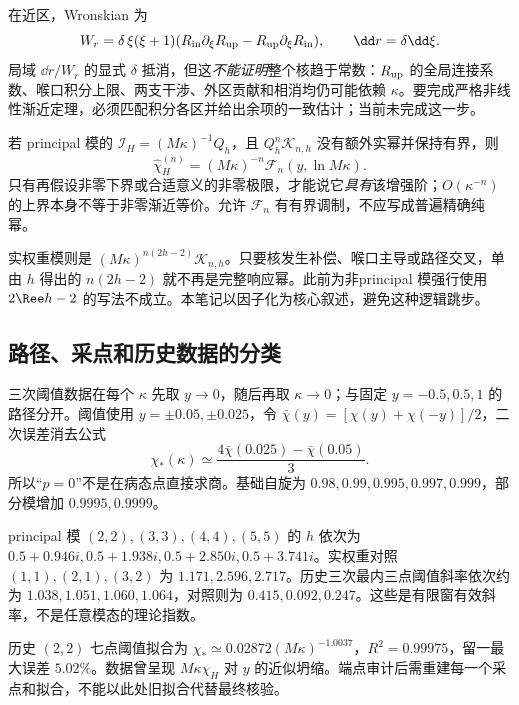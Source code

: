 在近区，Wronskian 为
\begin{equation}
 W_r=\delta\,\xi(\xi+1)
 (R_{\rm in}\partial_\xi R_{\rm up}-R_{\rm up}\partial_\xi R_{\rm in}),
 \qquad\dd r=\delta\dd\xi.
\end{equation}
局域 $\dd r/W_r$ 的显式 $\delta$ 抵消，但这\emph{不能证明}整个核趋于常数：$R_{\rm up}$ 的全局连接系数、喉口积分上限、两支干涉、外区贡献和相消均仍可能依赖 $\kappa$。要完成严格非线性渐近定理，必须匹配积分各区并给出余项的一致估计；当前未完成这一步。

若 principal 模的 $\mathcal I_H=(M\kappa)^{-1}Q_h$，且 $Q_h^n\mathcal K_{n,h}$ 没有额外实幂并保持有界，则
\begin{equation}
 \widehat\chi_H^{(n)}=(M\kappa)^{-n}
 \mathcal F_n(y,\ln M\kappa).
\end{equation}
只有再假设非零下界或合适意义的非零极限，才能说它\emph{具有}该增强阶；$O(\kappa^{-n})$ 的上界本身不等于非零渐近等价。允许 $\mathcal F_n$ 有有界调制，不应写成普遍精确纯幂。

实权重模则是 $(M\kappa)^{n(2h-2)}\mathcal K_{n,h}$。只要核发生补偿、喉口主导或路径交叉，单由 $h$ 得出的 $n(2h-2)$ 就不再是完整响应幂。此前为非principal 模强行使用 $2\Ree h-2$ 的写法不成立。本笔记以因子化为核心叙述，避免这种逻辑跳步。

\subsection{路径、采点和历史数据的分类}
三次阈值数据在每个 $\kappa$ 先取 $y\to0$，随后再取 $\kappa\to0$；与固定 $y=-0.5,0.5,1$ 的路径分开。阈值使用 $y=\pm0.05,\pm0.025$，令 $\bar\chi(y)=[\chi(y)+\chi(-y)]/2$，二次误差消去公式
\begin{equation}
 \chi_*(\kappa)\simeq\frac{4\bar\chi(0.025)-\bar\chi(0.05)}3.
\end{equation}
所以“$p=0$”不是在病态点直接求商。基础自旋为 $0.98,0.99,0.995,0.997,0.999$，部分模增加 $0.9995,0.9999$。

principal 模 $(2,2),(3,3),(4,4),(5,5)$ 的 $h$ 依次为 $0.5+0.946i,0.5+1.938i,0.5+2.850i,0.5+3.741i$。实权重对照 $(1,1),(2,1),(3,2)$ 为 $1.171,2.596,2.717$。历史三次最内三点阈值斜率依次约为 $1.038,1.051,1.060,1.064$，对照则为 $0.415,0.092,0.247$。这些是有限窗有效斜率，不是任意模态的理论指数。

历史 $(2,2)$ 七点阈值拟合为 $\chi_*\simeq0.02872(M\kappa)^{-1.0037}$，$R^2=0.99975$，留一最大误差 $5.02\%$。数据曾呈现 $M\kappa\chi_H$ 对 $y$ 的近似坍缩。端点审计后需重建每一个采点和拟合，不能以此处旧拟合代替最终核验。

